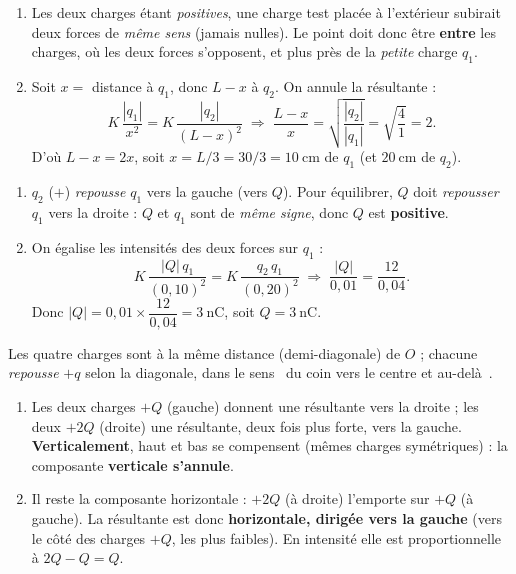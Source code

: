 \documentclass[11pt,a4paper]{article}
\begin{document}

\begin{corrige}
\begin{enumerate}[label=\alph*)]
  \item Les deux charges étant \emph{positives}, une charge test placée à l'extérieur subirait deux
        forces de \emph{même sens} (jamais nulles). Le point doit donc être \textbf{entre} les
        charges, où les deux forces s'opposent, et plus près de la \emph{petite} charge $q_1$.
  \item Soit $x = $ distance à $q_1$, donc $L-x$ à $q_2$. On annule la résultante :
        \[ K\,\frac{|q_1|}{x^2} = K\,\frac{|q_2|}{(L-x)^2}
           \;\Longrightarrow\; \frac{L-x}{x} = \sqrt{\frac{|q_2|}{|q_1|}} = \sqrt{\frac{4}{1}} = 2. \]
        D'où $L-x = 2x$, soit $x = L/3 = 30/3 = \SI{10}{\centi\metre}$ de $q_1$
        (et $\SI{20}{\centi\metre}$ de $q_2$).
\end{enumerate}
\end{corrige}

\begin{corrige}
\begin{enumerate}[label=\alph*)]
  \item $q_2$ ($+$) \emph{repousse} $q_1$ vers la gauche (vers $Q$). Pour équilibrer, $Q$ doit
        \emph{repousser} $q_1$ vers la droite : $Q$ et $q_1$ sont de \emph{même signe}, donc $Q$ est
        \textbf{positive}.
  \item On égalise les intensités des deux forces sur $q_1$ :
        \[ K\,\frac{|Q|\,q_1}{(0{,}10)^2} = K\,\frac{q_2\,q_1}{(0{,}20)^2}
           \;\Longrightarrow\; \frac{|Q|}{0{,}01} = \frac{12}{0{,}04}. \]
        Donc $|Q| = 0{,}01\times\dfrac{12}{0{,}04} = \SI{3}{\nano\coulomb}$, soit $Q = \SI{+3}{\nano\coulomb}$.
\end{enumerate}
\end{corrige}

\begin{corrige}
Les quatre charges sont à la même distance (demi-diagonale) de $O$ ; chacune \emph{repousse} $+q$
selon la diagonale, dans le sens \guillemotleft~du coin vers le centre et au-delà~\guillemotright.
\begin{enumerate}[label=\alph*)]
  \item Les deux charges $+Q$ (gauche) donnent une résultante vers la droite ; les deux $+2Q$
        (droite) une résultante, deux fois plus forte, vers la gauche. \textbf{Verticalement}, haut
        et bas se compensent (mêmes charges symétriques) : la composante \textbf{verticale
        s'annule}.
  \item Il reste la composante horizontale : $+2Q$ (à droite) l'emporte sur $+Q$ (à gauche). La
        résultante est donc \textbf{horizontale, dirigée vers la gauche} (vers le côté des charges
        $+Q$, les plus faibles). En intensité elle est proportionnelle à $2Q-Q = Q$.
\end{enumerate}
\end{corrige}
\end{document}

